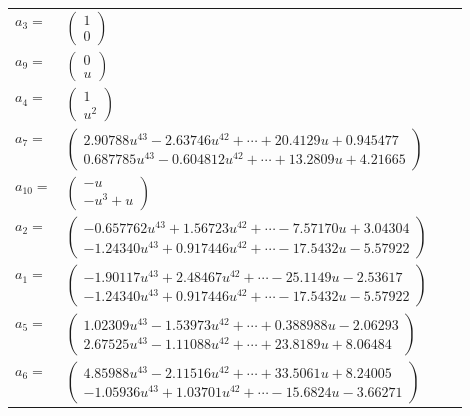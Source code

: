 \documentclass[1p]{elsarticle_modified}
\theoremstyle{definition}
\begin{document}
\begin{tabular}{m{7pt} m{180pt} m{7pt} m{180pt} }
\flushright $a_{3}=$&$\begin{pmatrix}1\\0\end{pmatrix}$ \\
\flushright $a_{9}=$&$\begin{pmatrix}0\\u\end{pmatrix}$ \\
\flushright $a_{4}=$&$\begin{pmatrix}1\\u^2\end{pmatrix}$ \\
\flushright $a_{7}=$&$\begin{pmatrix}2.90788 u^{43}-2.63746 u^{42}+\cdots+20.4129 u+0.945477\\0.687785 u^{43}-0.604812 u^{42}+\cdots+13.2809 u+4.21665\end{pmatrix}$ \\
\flushright $a_{10}=$&$\begin{pmatrix}- u\\- u^3+u\end{pmatrix}$ \\
\flushright $a_{2}=$&$\begin{pmatrix}-0.657762 u^{43}+1.56723 u^{42}+\cdots-7.57170 u+3.04304\\-1.24340 u^{43}+0.917446 u^{42}+\cdots-17.5432 u-5.57922\end{pmatrix}$ \\
\flushright $a_{1}=$&$\begin{pmatrix}-1.90117 u^{43}+2.48467 u^{42}+\cdots-25.1149 u-2.53617\\-1.24340 u^{43}+0.917446 u^{42}+\cdots-17.5432 u-5.57922\end{pmatrix}$ \\
\flushright $a_{5}=$&$\begin{pmatrix}1.02309 u^{43}-1.53973 u^{42}+\cdots+0.388988 u-2.06293\\2.67525 u^{43}-1.11088 u^{42}+\cdots+23.8189 u+8.06484\end{pmatrix}$ \\
\flushright $a_{6}=$&$\begin{pmatrix}4.85988 u^{43}-2.11516 u^{42}+\cdots+33.5061 u+8.24005\\-1.05936 u^{43}+1.03701 u^{42}+\cdots-15.6824 u-3.66271\end{pmatrix}$ \\

\end{tabular}
\end{document}
